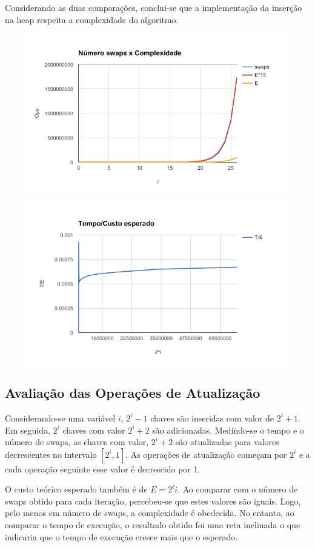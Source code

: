 \documentclass{iiufrgs}
\begin{document}
Considerando as duas comparaç\~oes, conclui-se que a implementaç\~ao da inserç\~ao na heap respeita a complexidade do algoritmo.


\begin{figure}[H]
\includegraphics[width=0.75\linewidth]{insert1}
\centering
\caption{}{}
\label{fig:insert1}
\end{figure}
\begin{figure}[H]
\includegraphics[width=0.75\linewidth]{insert2}
\centering
\caption{}{}
\label{fig:insert2}
\end{figure}
\subsection{Avaliaç\~ao das Operaç\~oes de Atualizaç\~ao}
Considerando-se uma variável $i$, $2^i -1$ chaves s\~ao inseridas com valor de $2^i +1$. Em seguida, $2^i$ chaves com valor $2^i +2$ s\~ao adicionadas. Medindo-se o tempo e o número de swaps, as chaves com valor, $2^i +2$ s\~ao atualizadas para valores decrescentes no intervalo $[2^i, 1]$. As operaç\~oes de atualizaç\~ao começam por $2^i$ e a cada operaç\~ao seguinte esse valor é decrescido por 1. 

O custo teórico esperado também é de $E = 2^i \dot i$. Ao comparar com o número de swaps obtido para cada iteraç\~ao, percebeu-se que estes valores s\~ao iguais. Logo, pelo menos em número de swaps, a complexidade é obedecida. No entanto, ao comparar o tempo de execuç\~ao, o resultado obtido foi uma reta inclinada o que indicaria que o tempo de execuç\~ao cresce mais que o esperado.
\end{document}
